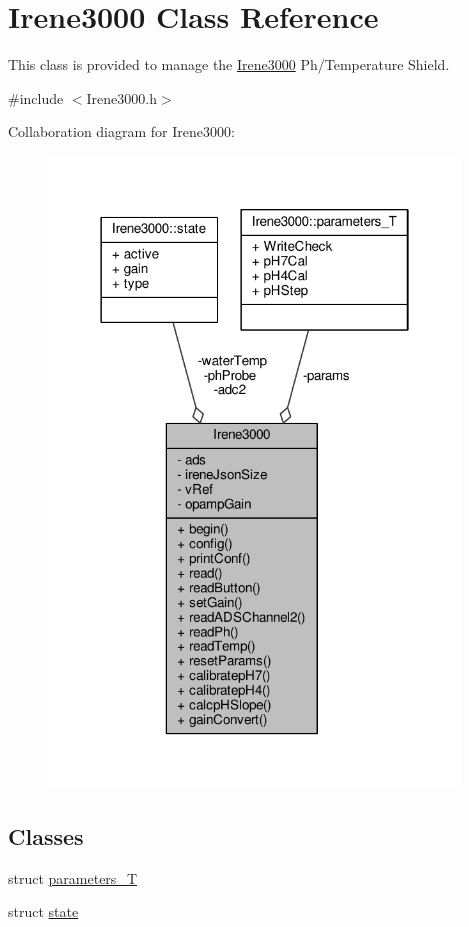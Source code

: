 \hypertarget{classIrene3000}{}\section{Irene3000 Class Reference}
\label{classIrene3000}


This class is provided to manage the \hyperlink{classIrene3000}{Irene3000} Ph/\+Temperature Shield.  




{\ttfamily \#include $<$Irene3000.\+h$>$}



Collaboration diagram for Irene3000\+:
\nopagebreak
\begin{figure}[H]
\begin{center}
\leavevmode
\includegraphics[width=310pt]{classIrene3000__coll__graph}
\end{center}
\end{figure}
\subsection*{Classes}
\begin{DoxyCompactItemize}
\item 
struct \hyperlink{structIrene3000_1_1parameters__T}{parameters\+\_\+T}
\item 
struct \hyperlink{structIrene3000_1_1state}{state}
\end{DoxyCompactItemize}
